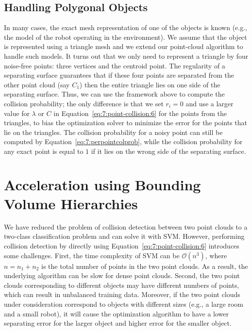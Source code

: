 \subsection{Handling Polygonal Objects}
In many cases, the exact mesh representation of one of the objects is known (e.g., the model of the robot operating in the environment).
We assume that the object is represented using a triangle mesh and we extend our point-cloud algorithm to handle such models.
It turns out that we only need to represent a triangle by four noise-free points: three vertices and the centroid point.
The regularity of a separating surface guarantees that if these four points are separated from the other point cloud (say $C_1$)
then the entire triangle lies on one side of the separating surface.
Thus, we can use the framework above to compute the collision probability; the only difference is that we
set $r_i = 0$ and use a larger value for $\lambda$ or $C$ in Equation~\ref{eq:7:point-collision:6} for the points from the triangles, to bias
the optimization solver to minimize the error for the points that lie on the triangles. The collision probability for a noisy point
can still be computed by Equation~\ref{eq:7:perpointcolprob}, while the collision probability for any exact point is equal to
$1$ if it lies on the wrong side of the separating surface.


\section{Acceleration using Bounding Volume Hierarchies}
\label{sec:7:bvh}


We have reduced the problem of collision detection between two point clouds to a two-class classification problem and can solve it with SVM. However, performing
collision detection by directly using Equation~\ref{eq:7:point-collision:6} introduces some challenges. First, the time complexity of SVM can be $\mathcal O(n^3)$,
where $n = n_1 + n_2$ is the total number of points in the two point clouds. As a result, the underlying algorithm can be slow for dense point clouds.
Second, the two point clouds corresponding to different objects may have different numbers of points, which can result in unbalanced training data.
Moreover, if the two point clouds under consideration correspond to objects with different sizes (e.g., a large room and a small robot), it will cause the optimization algorithm to have a lower separating error for the larger object and higher error for the smaller object.

